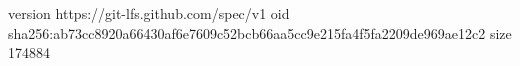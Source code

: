 version https://git-lfs.github.com/spec/v1
oid sha256:ab73cc8920a66430af6e7609c52bcb66aa5cc9e215fa4f5fa2209de969ae12c2
size 174884
